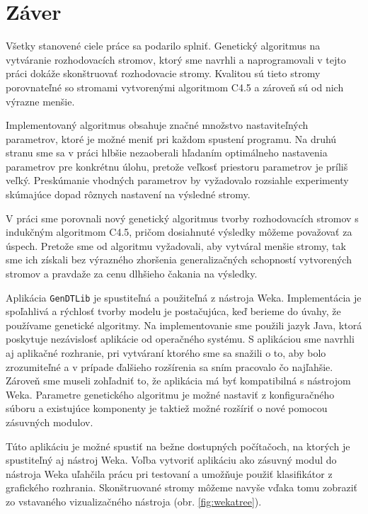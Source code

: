 \chapter{Záver}\label{kap:fin}
\renewcommand{\figurename}{Obrázok}
Všetky stanovené ciele práce sa podarilo splniť. Genetický algoritmus na vytváranie rozhodovacích stromov, ktorý sme navrhli a naprogramovali v tejto práci dokáže skonštruovať rozhodovacie stromy. Kvalitou sú tieto stromy porovnateľné so stromami vytvorenými algoritmom C4.5 a zároveň sú od nich výrazne menšie.

Implementovaný algoritmus obsahuje značné množstvo nastaviteľných parametrov, ktoré je možné meniť pri každom spustení programu. Na druhú stranu sme sa v práci hlbšie nezaoberali hľadaním optimálneho nastavenia parametrov pre konkrétnu úlohu, pretože veľkosť priestoru parametrov je príliš veľký. Preskúmanie vhodných parametrov by vyžadovalo rozsiahle experimenty skúmajúce dopad rôznych nastavení na výsledné stromy.

V práci sme porovnali nový genetický algoritmus tvorby rozhodovacích stromov s indukčným algoritmom C4.5, pričom dosiahnuté výsledky môžeme považovať za úspech.
Pretože sme od algoritmu vyžadovali, aby vytváral menšie stromy, tak sme ich získali bez výrazného zhoršenia generalizačných schopností vytvorených stromov a pravdaže za cenu dlhšieho čakania na výsledky.

Aplikácia \verb|GenDTLib| je spustiteľná a použiteľná z nástroja Weka. Implementácia je spoľahlivá a rýchlosť tvorby modelu je postačujúca, keď berieme do úvahy, že používame genetické algoritmy. Na implementovanie sme použili jazyk Java, ktorá poskytuje nezávislosť aplikácie od operačného systému. S aplikáciou sme navrhli aj aplikačné rozhranie, pri vytváraní ktorého sme sa snažili o to, aby bolo zrozumiteľné a v prípade ďalšieho rozšírenia sa sním pracovalo čo najľahšie. Zároveň sme museli zohľadniť to, že aplikácia má byť kompatibilná s nástrojom Weka. Parametre genetického algoritmu je možné nastaviť z konfiguračného súboru a existujúce komponenty je taktiež možné rozšíriť o nové pomocou zásuvných modulov.

Túto aplikáciu je možné spustiť na bežne dostupných počítačoch, na ktorých je spustiteľný aj nástroj Weka. 
Voľba vytvoriť aplikáciu ako zásuvný modul do nástroja Weka uľahčila prácu pri testovaní a umožňuje použiť klasifikátor z grafického rozhrania. Skonštruované stromy môžeme navyše vďaka tomu zobraziť zo vstavaného vizualizačného nástroja (obr. \ref{fig:wekatree}).

